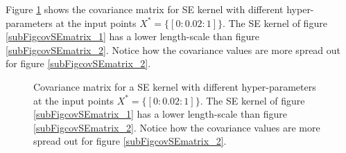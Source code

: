 Figure \ref{figGPCovarianceMatrix} shows the covariance matrix for SE kernel with different hyper-parameters at the input points $X^{*} = \{[0:0.02:1]\}$. The SE kernel of figure \ref{subFigcovSEmatrix_1} has a lower length-scale than figure \ref{subFigcovSEmatrix_2}. Notice how the covariance values are more spread out for figure \ref{subFigcovSEmatrix_2}.

\begin{figure}[!ht]
  \centering
    \quad
{}\quad
  
       \caption{Covariance matrix for a SE kernel with different hyper-parameters at the input points $X^{*} = \{[0:0.02:1]\}$. The SE kernel of figure \ref{subFigcovSEmatrix_1} has a lower length-scale than figure \ref{subFigcovSEmatrix_2}. Notice how the covariance values are more spread out for figure \ref{subFigcovSEmatrix_2}.}\label{figGPCovarianceMatrix}
\end{figure}

